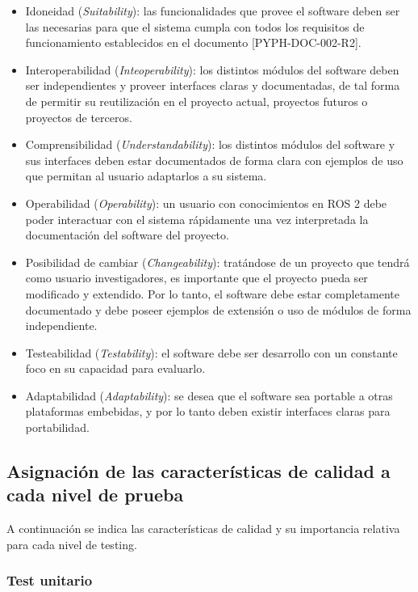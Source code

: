 \documentclass[
11pt, %
codirector, %
]{simple_charter}
\begin{document}
\begin{itemize}
	\item Idoneidad (\textit{Suitability}): las funcionalidades que provee el software deben ser las
	necesarias para que el sistema cumpla con todos los requisitos de funcionamiento establecidos en
	el documento [PYPH-DOC-002-R2].
	\item Interoperabilidad (\textit{Inteoperability}): los distintos módulos del software deben ser
	independientes y proveer interfaces claras y documentadas, de tal forma de permitir su
	reutilización en el proyecto actual, proyectos futuros o proyectos de terceros.
	\item Comprensibilidad (\textit{Understandability}): los distintos módulos del software y sus
	interfaces deben estar documentados de forma clara con ejemplos de uso que permitan al usuario
	adaptarlos a su sistema.
	\item Operabilidad (\textit{Operability}): un usuario con conocimientos en ROS 2 debe poder
	interactuar con el sistema rápidamente una vez interpretada la documentación del software del
	proyecto.
	\item Posibilidad de cambiar (\textit{Changeability}): tratándose de un proyecto que tendrá como
	usuario investigadores, es importante que el proyecto pueda ser modificado y extendido. Por lo
	tanto, el software debe estar completamente documentado y debe poseer ejemplos de extensión o uso
	de módulos de forma independiente.
	\item Testeabilidad (\textit{Testability}): el software debe ser desarrollo con un constante foco
	en su capacidad para evaluarlo.
	\item Adaptabilidad (\textit{Adaptability}):  se desea que el software sea portable a otras
	plataformas embebidas, y por lo tanto deben existir interfaces claras para portabilidad.
\end{itemize}

\subsection{Asignación de las características de calidad a cada nivel de prueba}
\label{ssec:asignacion-de-las-caracteristicas-de-calidad-a-cada-nivel-de-prueba}

A continuación se indica las características de calidad y su importancia relativa para cada nivel de
testing.

\subsubsection{Test unitario}
\label{sssec:test-unitario}
\end{document}
